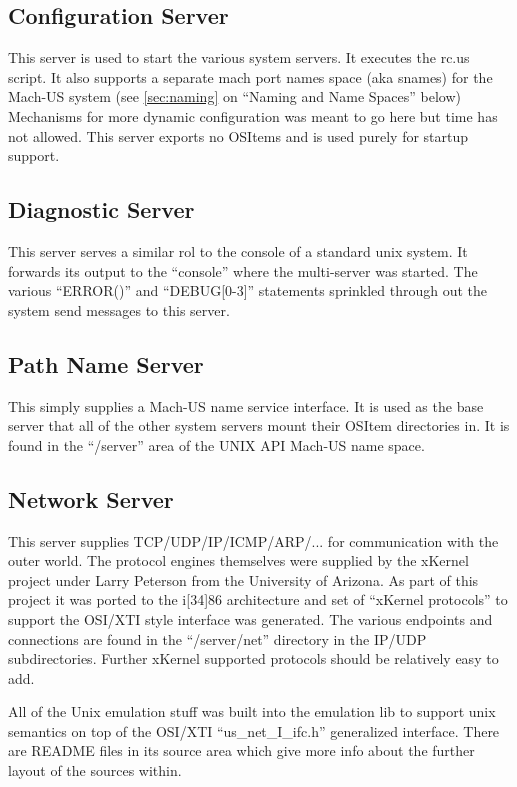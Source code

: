 \subsection{Configuration Server}
This server is used to start the various system servers.  It executes
the rc.us script.  It also supports a separate mach port names space
(aka snames) for the Mach-US system (see {\SECREF} \ref{sec:naming} on
``Naming and Name Spaces'' below)
Mechanisms for more dynamic configuration was meant to go here but time
has not allowed.  This server exports no OSItems and is used purely for
startup support.

\subsection{Diagnostic Server}
This server serves a similar rol to the console of a standard unix system.
It forwards its output to the ``console'' where the multi-server was started.
The various ``ERROR()'' and ``DEBUG[0-3]'' statements sprinkled through out
the system send messages to this server.

\subsection{Path Name Server}  This simply supplies a Mach-US name service
interface.  It is used as the base server that all of the other system servers
mount their OSItem directories in.  It is found in the ``/server'' area
of the UNIX API Mach-US name space.

\subsection{Network Server}  This server supplies TCP/UDP/IP/ICMP/ARP/... for
communication with the outer world.  The protocol engines themselves were
supplied by the xKernel project under Larry Peterson from the University
of Arizona.  As part of this project it was ported to the i[34]86 architecture
and set of ``xKernel protocols'' to support the OSI/XTI style
interface was generated.  The various endpoints and connections are found
in the ``/server/net'' directory in the IP/UDP subdirectories.  Further
xKernel supported protocols should be relatively easy to add.

All of the Unix emulation stuff was built into the emulation lib to
support unix semantics on top of the OSI/XTI ``us\_net\_I\_ifc.h''
generalized interface.
There are README files in its source area which give more info
about the further layout of the sources within.

